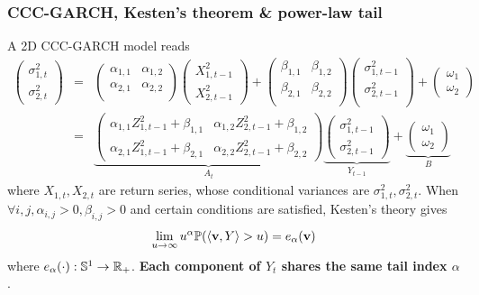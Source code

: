 \documentclass{beamer}
\begin{document}
\begin{frame}
  \frametitle{CCC-GARCH, Kesten's theorem \& power-law tail}
  A 2D CCC-GARCH model reads
  \begin{eqnarray*}
    \begin{pmatrix}
      \sigma_{1, t}^2 \\
      \sigma_{2, t}^2
    \end{pmatrix}
    &=&
    \begin{pmatrix}
      \alpha_{1, 1} & \alpha_{1, 2} \\
      \alpha_{2, 1} & \alpha_{2, 2} \\
    \end{pmatrix}
    \begin{pmatrix}
      X_{1, t-1}^2 \\
      X_{2, t-1}^2
    \end{pmatrix}
    +
    \begin{pmatrix}
      \beta_{1, 1} & \beta_{1, 2} \\
      \beta_{2, 1} & \beta_{2, 2} \\
    \end{pmatrix}
    \begin{pmatrix}
      \sigma_{1,t-1}^2 \\
      \sigma_{2,t-1}^2 \\
    \end{pmatrix}
    +
    \begin{pmatrix}
      \omega_1 \\
      \omega_2
    \end{pmatrix} \\
    &=&
    \underbrace{
      \begin{pmatrix}
        \alpha_{1,1} Z_{1,t-1}^2 + \beta_{1,1} & \alpha_{1,2} Z_{2,t-1}^2 + \beta_{1,2} \\
        \alpha_{2,1} Z_{1,t-1}^2 + \beta_{2,1} & \alpha_{2,2} Z_{2,t-1}^2 + \beta_{2,2}
      \end{pmatrix}
    }_{A_t}
    \underbrace{
      \begin{pmatrix}
        \sigma_{1,t-1}^2 \\
        \sigma_{2,t-1}^2
      \end{pmatrix}
    }_{Y_{t-1}}
    +
    \underbrace{
      \begin{pmatrix}
        \omega_1 \\
        \omega_2
      \end{pmatrix}
    }_{B}
  \end{eqnarray*}
  where $X_{1, t}, X_{2, t}$ are return series, whose conditional
  variances are $\sigma_{1, t}^2, \sigma_{2, t}^2$.
  When $\forall i,j, \alpha_{i, j} > 0, \beta_{i,j} > 0$ and certain
  conditions are satisfied, Kesten's theory \cite{kesten:1973} gives
  \[
  \lim_{u \to \infty} u^{\alpha}
  \mathbb{P}(\langle\mathbf{v}, Y\rangle > u) = e_\alpha(\mathbf{v})
  \]
  where $e_\alpha(\cdot): \mathbb S^{1} \to \mathbb R_+$.
  {\bf Each component of $Y_t$ shares the same tail index $\alpha$}.
  
\end{frame}
\end{document}
